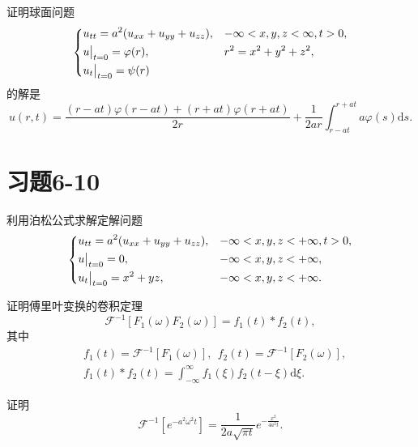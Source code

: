 \begin{yyEx}
	证明球面问题\begin{equation*}
		\begin{dcases}
			u_{tt} = a^2(u_{xx} + u_{yy} + u_{zz}), &-\infty<x,y,z<\infty,t>0,\\
			u\big|_{t = 0} = \varphi(r), &r^2 = x^2+y^2+z^2,\\
			u_t\big|_{t = 0} = \psi(r)&~
		\end{dcases}
	\end{equation*}
	的解是
	\begin{equation*}
		u(r,t) = \frac{(r-at)\varphi(r-at)+(r+at)\varphi(r+at)}{2r}+\frac{1}{2ar}\int_{r-at}^{r+at}a\varphi(s)\mathrm{d}s.
	\end{equation*}
\end{yyEx}

\section{习题6-10}

\begin{yyEx}
	利用泊松公式求解定解问题
	\begin{equation*}
		\begin{dcases}
			u_{tt} = a^2(u_{xx} + u_{yy} + u_{zz}),&-\infty<x,y,z<+\infty,t>0,\\
			u\big|_{t = 0} = 0, &-\infty<x,y,z<+\infty,\\
			u_t\big|_{t = 0} = x^2+yz, &-\infty<x,y,z<+\infty.
		\end{dcases}
	\end{equation*}
\end{yyEx}

\begin{yyEx}
	证明傅里叶变换的卷积定理\begin{equation*}
		\mathcal{F}^{-1}[F_1(\omega)F_2(\omega)] = f_1(t)* f_2(t),
	\end{equation*}
	其中\begin{equation*}
		\begin{split}
			&f_1(t) = \mathcal{F}^{-1}[F_1(\omega)],~~f_2(t) = \mathcal{F}^{-1}[F_2(\omega)],\\
			&f_1(t)*f_2(t) = \int_{-\infty}^{\infty}f_1(\xi)f_2(t-\xi)\mathrm{d}\xi.
		\end{split}
	\end{equation*}
\end{yyEx}

\begin{yyEx}
	证明\begin{equation*}
		\mathcal{F}^{-1}\left[ e^{-a^2\omega^2 t} \right] = \frac{1}{2a\sqrt{\pi t}} e^{-\frac{x^2}{4a^2t}}.
	\end{equation*}
\end{yyEx}


